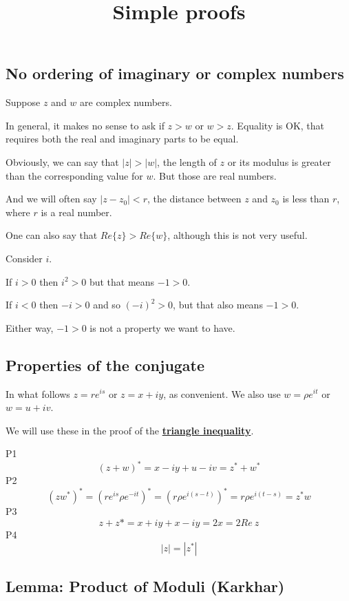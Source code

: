 \documentclass[11pt, oneside]{article}
\title{Simple proofs}
\date{}
\begin{document}
\maketitle
\Large


\subsection*{No ordering of imaginary or complex numbers}
Suppose $z$ and $w$ are complex numbers.

In general, it makes no sense to ask if $z > w$ or $w > z$.  Equality is OK, that requires both the real and imaginary parts to be equal.

Obviously, we can say that $|z| > |w|$, the length of $z$ or its modulus is greater than the corresponding value for $w$.  But those are real numbers.

And we will often say $|z - z_0| < r$, the distance between $z$ and $z_0$ is less than $r$, where $r$ is a real number.

One can also say that $Re \{ z \} > Re \{ w \}$, although this is not very useful.

Consider $i$.

If $i > 0$ then $i^2 > 0$ but that means $-1 > 0$.

If $i < 0$ then $-i > 0$ and so $(-i)^2 > 0$, but that also means $-1 > 0$.

Either way,  $-1 > 0$ is not a property we want to have.

\subsection*{Properties of the conjugate}

\label{sec:conjugate_properties}

In what follows $z = re^{is}$ or $z = x + iy$, as convenient.  We also use $w = \rho e^{it}$ or $w = u + iv$.

We will use these in the proof of the \hyperref[sec:tri_inequality]{\textbf{triangle inequality}}.

P1
\[ (z + w)^* = x - iy + u - iv = z^* + w^* \]
P2
\[ (zw^*)^* = (re^{is}  \rho e^{-it})^* = (r \rho e^{i(s - t)})^* = r \rho e^{i(t - s)} = z^*w \]
P3
\[ z + z* = x + iy + x - iy = 2x = 2 Re \ z \]
P4
\[ |z| = |z^*| \]

\subsection*{Lemma:  Product of Moduli (Karkhar)}
\end{document}
